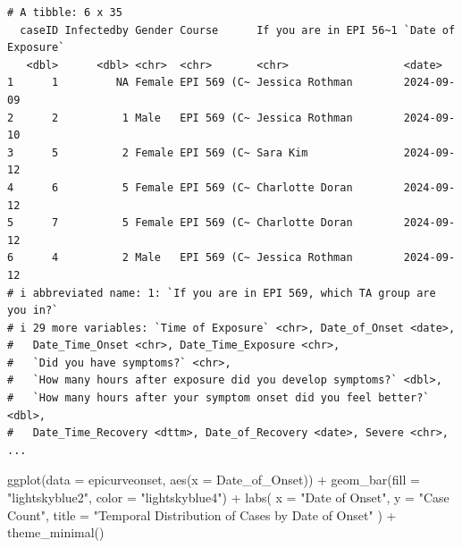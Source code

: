 \documentclass[
  letterpaper,
  DIV=11,
  numbers=noendperiod]{scrartcl}
\newenvironment{Shaded}{\begin{snugshade}}{\end{snugshade}}
\newcommand{\AttributeTok}[1]{\textcolor[rgb]{0.40,0.45,0.13}{#1}}
\newcommand{\FunctionTok}[1]{\textcolor[rgb]{0.28,0.35,0.67}{#1}}
\newcommand{\NormalTok}[1]{\textcolor[rgb]{0.00,0.23,0.31}{#1}}
\newcommand{\OtherTok}[1]{\textcolor[rgb]{0.00,0.23,0.31}{#1}}
\newcommand{\SpecialCharTok}[1]{\textcolor[rgb]{0.37,0.37,0.37}{#1}}
\newcommand{\StringTok}[1]{\textcolor[rgb]{0.13,0.47,0.30}{#1}}
\begin{document}
\begin{Shaded}
\end{Shaded}

\begin{verbatim}
# A tibble: 6 x 35
  caseID Infectedby Gender Course      If you are in EPI 56~1 `Date of Exposure`
   <dbl>      <dbl> <chr>  <chr>       <chr>                  <date>            
1      1         NA Female EPI 569 (C~ Jessica Rothman        2024-09-09        
2      2          1 Male   EPI 569 (C~ Jessica Rothman        2024-09-10        
3      5          2 Female EPI 569 (C~ Sara Kim               2024-09-12        
4      6          5 Female EPI 569 (C~ Charlotte Doran        2024-09-12        
5      7          5 Female EPI 569 (C~ Charlotte Doran        2024-09-12        
6      4          2 Male   EPI 569 (C~ Jessica Rothman        2024-09-12        
# i abbreviated name: 1: `If you are in EPI 569, which TA group are you in?`
# i 29 more variables: `Time of Exposure` <chr>, Date_of_Onset <date>,
#   Date_Time_Onset <chr>, Date_Time_Exposure <chr>,
#   `Did you have symptoms?` <chr>,
#   `How many hours after exposure did you develop symptoms?` <dbl>,
#   `How many hours after your symptom onset did you feel better?` <dbl>,
#   Date_Time_Recovery <dttm>, Date_of_Recovery <date>, Severe <chr>, ...
\end{verbatim}

\begin{Shaded}
\begin{Highlighting}[]
\FunctionTok{ggplot}\NormalTok{(}\AttributeTok{data =}\NormalTok{ epicurveonset, }\FunctionTok{aes}\NormalTok{(}\AttributeTok{x =}\NormalTok{ Date\_of\_Onset)) }\SpecialCharTok{+}
  \FunctionTok{geom\_bar}\NormalTok{(}\AttributeTok{fill =} \StringTok{"lightskyblue2"}\NormalTok{, }\AttributeTok{color =} \StringTok{"lightskyblue4"}\NormalTok{) }\SpecialCharTok{+}
  \FunctionTok{labs}\NormalTok{(}
    \AttributeTok{x =} \StringTok{"Date of Onset"}\NormalTok{,}
    \AttributeTok{y =} \StringTok{"Case Count"}\NormalTok{,}
    \AttributeTok{title =} \StringTok{"Temporal Distribution of Cases by Date of Onset"}
\NormalTok{  ) }\SpecialCharTok{+}
  \FunctionTok{theme\_minimal}\NormalTok{()}
\end{Highlighting}
\end{Shaded}
\end{document}
